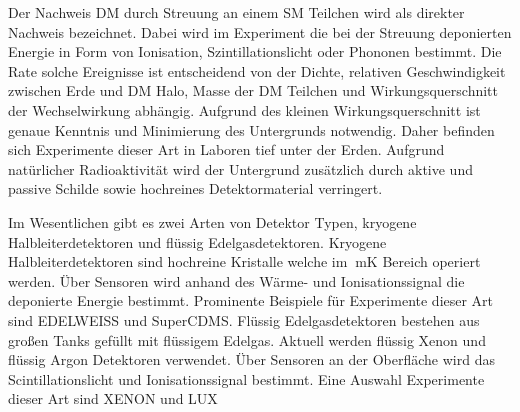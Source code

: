 Der Nachweis DM durch Streuung an einem SM Teilchen wird als direkter Nachweis bezeichnet.
Dabei wird im Experiment die bei der Streuung deponierten Energie in Form von Ionisation, Szintillationslicht oder Phononen bestimmt.
Die Rate solche Ereignisse ist entscheidend von der Dichte, relativen Geschwindigkeit zwischen Erde und DM Halo, Masse der DM Teilchen und Wirkungsquerschnitt der Wechselwirkung abhängig.
Aufgrund des kleinen Wirkungsquerschnitt ist genaue Kenntnis und Minimierung des Untergrunds notwendig.
Daher befinden sich Experimente dieser Art in Laboren tief unter der Erden.
Aufgrund natürlicher Radioaktivität wird der Untergrund zusätzlich durch aktive und passive Schilde sowie hochreines Detektormaterial verringert.

Im Wesentlichen gibt es zwei Arten von Detektor Typen, kryogene Halbleiterdetektoren und flüssig Edelgasdetektoren.
Kryogene Halbleiterdetektoren sind hochreine Kristalle welche im $\SI{}{\milli\kelvin}$ Bereich operiert werden.
Über Sensoren wird anhand des Wärme- und Ionisationssignal die deponierte Energie bestimmt.
Prominente Beispiele für Experimente dieser Art sind EDELWEISS\cite{EDWIII} und SuperCDMS\cite{Agnese2018}.
Flüssig Edelgasdetektoren bestehen aus großen Tanks gefüllt mit flüssigem Edelgas.
Aktuell werden flüssig Xenon und flüssig Argon Detektoren verwendet.
Über Sensoren an der Oberfläche wird das Scintillationslicht und Ionisationssignal bestimmt.
Eine Auswahl Experimente dieser Art sind XENON\cite{Aprile2017} und LUX\cite{DaSilva2017}
